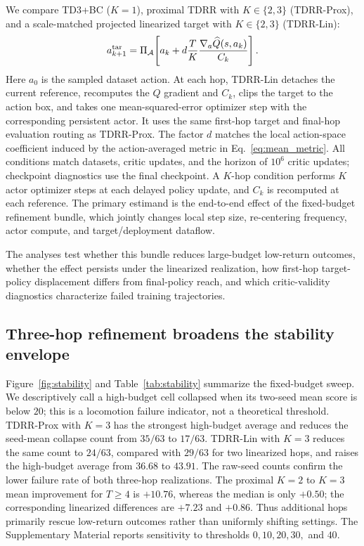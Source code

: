 \documentclass[letterpaper]{article}
\begin{document}
We compare TD3+BC ($K=1$), proximal TDRR with $K\in\{2,3\}$ (TDRR-Prox), and a
scale-matched projected linearized target with $K\in\{2,3\}$ (TDRR-Lin):
\begin{equation}
 a_{k+1}^{\rm tar}=\Pi_{\mathcal A}\!\left[
 a_k+d\frac{T}{K}\frac{\nabla_a\widehat Q(s,a_k)}{C_k}\right].
 \label{eq:linearized_target}
\end{equation}
Here $a_0$ is the sampled dataset action. At each hop, TDRR-Lin detaches the
current reference, recomputes the $\widehat Q$ gradient and $C_k$, clips the
target to the action box, and takes one mean-squared-error optimizer step with
the corresponding persistent actor. It uses the same first-hop target and
final-hop evaluation routing as TDRR-Prox. The factor $d$ matches the local
action-space coefficient induced by the action-averaged metric in
Eq.~\eqref{eq:mean_metric}. All conditions match datasets, critic updates, and
the horizon of $10^6$ critic updates; checkpoint diagnostics use the final
checkpoint. A $K$-hop condition performs $K$ actor optimizer steps at each
delayed policy update, and $C_k$ is recomputed at each reference. The primary
estimand is the end-to-end effect of the fixed-budget refinement bundle, which
jointly changes local step size, re-centering frequency, actor compute, and
target/deployment dataflow.

The analyses test whether this bundle reduces large-budget low-return
outcomes, whether the effect persists under the linearized realization, how
first-hop target-policy displacement differs from final-policy reach, and which
critic-validity diagnostics characterize failed training trajectories.

\subsection{Three-hop refinement broadens the stability envelope}

Figure~\ref{fig:stability} and Table~\ref{tab:stability} summarize the fixed-budget sweep. We descriptively call a high-budget cell collapsed when its two-seed mean score is below $20$; this is a locomotion failure indicator, not a theoretical threshold. TDRR-Prox with $K=3$ has the strongest high-budget average and reduces the seed-mean collapse count from $35/63$ to $17/63$. TDRR-Lin with $K=3$ reduces the same count to $24/63$, compared with $29/63$ for two linearized hops, and raises the high-budget average from $36.68$ to $43.91$. The raw-seed counts confirm the lower failure rate of both three-hop realizations. The proximal $K=2$ to $K=3$ mean improvement for $T\ge4$ is $+10.76$, whereas the median is only $+0.50$; the corresponding linearized differences are $+7.23$ and $+0.86$. Thus additional hops primarily rescue low-return outcomes rather than uniformly shifting settings. The Supplementary Material reports sensitivity to thresholds $0,10,20,30,$ and $40$.
\end{document}
